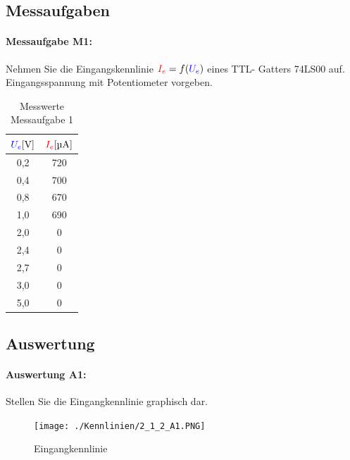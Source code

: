 \documentclass[a4paper,titlepage,parskip]{scrreprt}
\newcommand{\spannung}[1]{\textcolor{blue}{#1}}
\newcommand{\strom}[1]{\textcolor{red}{#1}}
\begin{document}
      \subsection{Messaufgaben}
        \paragraph{Messaufgabe M1:} Nehmen Sie die Eingangskennlinie $\strom{I_e} = f(\spannung{U_e})$ eines TTL- Gatters 74LS00 auf. Eingangsspannung mit Potentiometer vorgeben.
            \begin{center}
                \begin{table}[!hbtp]
                    \caption{Messwerte Messaufgabe 1}
                    \renewcommand{\arraystretch}{1.3}
                    \begin{center}
                        \begin{tabular}{c|c}
                            $\spannung{U_e} [\si{\volt}]$ & $\strom{I_e} [\si{\micro\ampere}]$ \\ \hline
                            0,2 & 720\\
                            0,4 & 700\\
                            0,8 & 670\\
                            1,0 & 690\\
                            2,0 & 0\\
                            2,4 & 0\\
                            2,7 & 0\\
                            3,0 & 0\\
                            5,0 & 0\\
                        \end{tabular}
                    \end{center}
                \end{table}
            \end{center}


      \subsection{Auswertung}
        \paragraph{Auswertung A1:} Stellen Sie die Eingangkennlinie graphisch dar.

          \begin{figure}[!htbp]
                \begin{center}
                    \texttt{[image: ./Kennlinien/2\_1\_2\_A1.PNG]}
                \end{center}
                \caption{Eingangkennlinie}
                \label{fig:3_1_A1}
            \end{figure}
\end{document}
